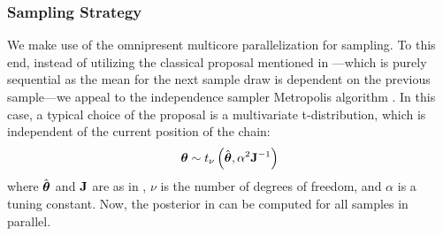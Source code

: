 \subsubsection{Sampling Strategy} 
We make use of the omnipresent multicore parallelization for sampling. To this end, instead of utilizing the classical proposal mentioned in ---which is purely sequential as the mean for the next sample draw is dependent on the previous sample---we appeal to the independence sampler Metropolis algorithm \cite{gelman2004}. In this case, a typical choice of the proposal is a multivariate t-distribution, which is independent of the current position of the chain:
\begin{equation} \elabel{proposal}
  \vparam \sim \studentst{\nu}{\hat{\vparam}}{\alpha^2 \mOI^{-1}}
\end{equation}
where $\hat{{\boldsymbol\theta}}$ and $\mathbf{J}$ are as in , $\nu$ is the number of degrees of freedom, and $\alpha$ is a tuning constant. Now, the posterior in  can be computed for all samples in parallel.
